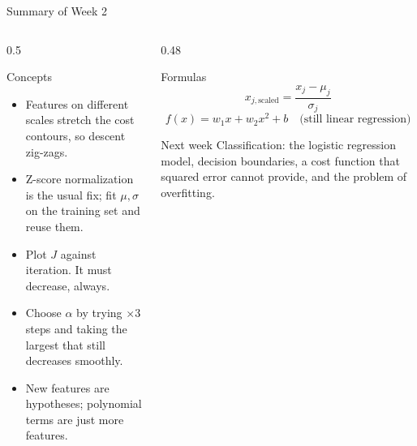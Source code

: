 \documentclass[aspectratio=169,10pt]{beamer}
\begin{document}
\begin{frame}{Summary of Week 2}
  \footnotesize
  \begin{columns}[T,onlytextwidth]
    \begin{column}{0.5\textwidth}
      \begin{block}{Concepts}
        \begin{itemize}
          \item Features on different scales stretch the cost contours, so descent zig-zags.
          \item Z-score normalization is the usual fix; fit $\mu,\sigma$ on the training set
                and reuse them.
          \item Plot $J$ against iteration. It must decrease, always.
          \item Choose $\alpha$ by trying $\times 3$ steps and taking the largest that still
                decreases smoothly.
          \item New features are hypotheses; polynomial terms are just more features.
        \end{itemize}
      \end{block}
    \end{column}
    \begin{column}{0.48\textwidth}
      \begin{block}{Formulas}
        \[ x_{j,\text{scaled}} = \frac{x_j-\mu_j}{\sigma_j} \]
        \[ f(x) = w_1x + w_2x^2 + b \quad\text{(still linear regression)} \]
      \end{block}
      \begin{block}{Next week}
        \footnotesize
        Classification: the logistic regression model, decision boundaries, a cost function
        that squared error cannot provide, and the problem of overfitting.
      \end{block}
    \end{column}
  \end{columns}
\end{frame}
\end{document}

